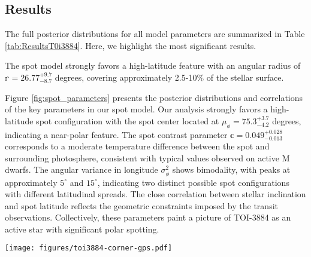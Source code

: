 \documentclass[twocolumn]{aastex631}
\begin{document}
\subsection{Results}
The full posterior distributions for all model parameters are summarized in Table \ref{tab:ResultsT0i3884}. Here, we highlight the 
most significant results.

The spot model strongly favors a high-latitude feature with an angular radius of $\mathbb{r} = 26.77^{+9.7}_{-8.7}$ degrees, 
covering approximately 2.5-10\% of the stellar surface. 

Figure \ref{fig:spot_parameters} presents the posterior distributions and correlations of the key parameters in our spot model. 
Our analysis strongly favors a high-latitude spot configuration with the spot center located at $\mu_{\phi} = {75.3}^{+3.7}_{-4.2}$ 
degrees, indicating a near-polar feature. The spot contrast parameter $\mathbb{c} = 0.049^{+0.028}_{-0.013}$ corresponds to a 
moderate temperature difference between the spot and surrounding photosphere, consistent with typical values observed on active M 
dwarfs. The angular variance in longitude $\sigma^2_{\phi}$ shows bimodality, with peaks at approximately $5^{\circ}$ 
and $15^{\circ}$, indicating two distinct possible spot configurations with different latitudinal spreads. 
The close correlation between stellar inclination and spot latitude reflects the geometric constraints imposed by the transit 
observations. Collectively, these parameters paint a picture of TOI-3884 as an active star with significant polar spotting.

\begin{figure*}[hbt!]
    \centering
    \texttt{[image: figures/toi3884-corner-gps.pdf]}
    \caption{Corner plot showing the posterior distributions and correlations for the spot model parameters. 
    The diagonal panels display the marginalized posterior distributions for each parameter: the spot size 
    $\mathbb{r}$ ($^{\circ}$), spot contrast $\mathbb{c}$, number of spots $\mathbb{n}$, spot latitude $\mu_{\phi}$ ($^{\circ}$), 
    and the angular variance in latitude $\sigma^2_{\phi}$ ($^{\circ}$). The spot latitude is concentrated at high values around 
    $75^{\circ}$--$80^{\circ}$, 
    confirming the presence of a near-polar spot. The spot contrast is relatively modest with most of the probability mass below
     0.1. The number of spots tends toward values between 7.5 and 10, suggesting a relatively small number of spots.}
    \label{fig:spot_parameters}
\end{figure*}
\end{document}
